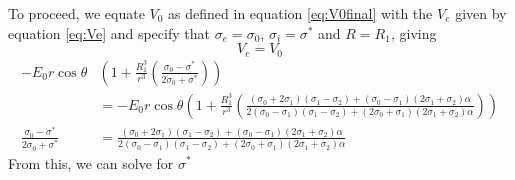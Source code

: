 To proceed, we equate $V_0$ as defined in equation \ref{eq:V0final} with the $V_e$ given by equation \ref{eq:Ve} and specify that $\sigma_e = \sigma_0$, $\sigma_i = \sigma^*$ and $R = R_1$, giving
\begin{displaymath}
    V_e= V_0
\end{displaymath}
\begin{displaymath}
    \begin{split}
    -E_0 r \cos \theta &\left(1 + \frac{R_1^3}{r^3}\left(\frac{\sigma_0-\sigma^*}{2\sigma_0+\sigma^*}\right)\right)
    \\ &=
    -E_0 r \cos\theta
    \left(1+
    \frac{R_1^{3}}{r^3}
    \left(
    \frac{
    (\sigma_0 + 2\sigma_1)(\sigma_1 - \sigma_2) + (\sigma_0 - \sigma_1)(2\sigma_1 + \sigma_2)\alpha
    }
    {
    2 (\sigma_0-\sigma_1)(\sigma_1 - \sigma_2) + (2\sigma_0 + \sigma_1)(2\sigma_1 + \sigma_2)\alpha
    }
    \right)\right)
    \\
    \frac{\sigma_0-\sigma^*}{2\sigma_0+\sigma^*}
    &=
    \frac{
    (\sigma_0 + 2\sigma_1)(\sigma_1 - \sigma_2) + (\sigma_0 - \sigma_1)(2\sigma_1 + \sigma_2)\alpha
    }
    {
    2 (\sigma_0-\sigma_1)(\sigma_1 - \sigma_2) + (2\sigma_0 + \sigma_1)(2\sigma_1 + \sigma_2)\alpha
    }
    \end{split}
\end{displaymath}
From this, we can solve for $\sigma^*$
